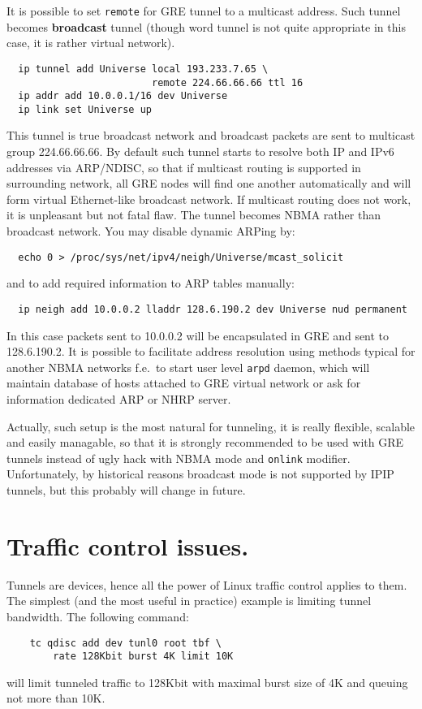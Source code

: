 It is possible to set \verb|remote| for GRE tunnel to a multicast
address. Such tunnel becomes {\bf broadcast} tunnel (though word
tunnel is not quite appropriate in this case, it is rather virtual network).
\begin{verbatim}
  ip tunnel add Universe local 193.233.7.65 \
                         remote 224.66.66.66 ttl 16
  ip addr add 10.0.0.1/16 dev Universe
  ip link set Universe up
\end{verbatim}
This tunnel is true broadcast network and broadcast packets are
sent to multicast group 224.66.66.66. By default such tunnel starts
to resolve both IP and IPv6 addresses via ARP/NDISC, so that
if multicast routing is supported in surrounding network, all GRE nodes
will find one another automatically and will form virtual Ethernet-like
broadcast network. If multicast routing does not work, it is unpleasant
but not fatal flaw. The tunnel becomes NBMA rather than broadcast network.
You may disable dynamic ARPing by:
\begin{verbatim}
  echo 0 > /proc/sys/net/ipv4/neigh/Universe/mcast_solicit
\end{verbatim}
and to add required information to ARP tables manually:
\begin{verbatim}
  ip neigh add 10.0.0.2 lladdr 128.6.190.2 dev Universe nud permanent
\end{verbatim}
In this case packets sent to 10.0.0.2 will be encapsulated in GRE
and sent to 128.6.190.2. It is possible to facilitate address resolution
using methods typical for another NBMA networks f.e.\ to start user
level \verb|arpd| daemon, which will maintain database of hosts attached
to GRE virtual network or ask for information
dedicated ARP or NHRP server.


Actually, such setup is the most natural for tunneling,
it is really flexible, scalable and easily managable, so that
it is strongly recommended to be used with GRE tunnels instead of ugly
hack with NBMA mode and \verb|onlink| modifier. Unfortunately,
by historical reasons broadcast mode is not supported by IPIP tunnels,
but this probably will change in future.



\section{Traffic control issues.}

Tunnels are devices, hence all the power of Linux traffic control
applies to them. The simplest (and the most useful in practice)
example is limiting tunnel bandwidth. The following command:
\begin{verbatim}
    tc qdisc add dev tunl0 root tbf \
        rate 128Kbit burst 4K limit 10K
\end{verbatim}
will limit tunneled traffic to 128Kbit with maximal burst size of 4K
and queuing not more than 10K.

